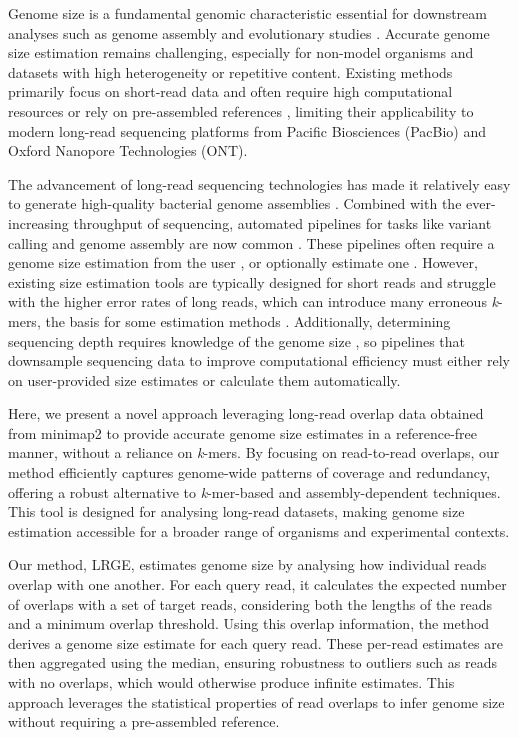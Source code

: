 \documentclass[unnumsec,webpdf,modern,large]{oup-authoring-template}
\theoremstyle{thmstyleone}%
\theoremstyle{thmstyletwo}%
\theoremstyle{thmstylethree}%
\newcommand{\lrge}{LRGE}
\newcommand{\kmer}{\textit{k}-mer}
\begin{document}
Genome size is a fundamental genomic characteristic essential for downstream analyses such as genome assembly \citep{wick_benchmarking_2020} and evolutionary studies \citep{pellicer_plant_2020}. Accurate genome size estimation remains challenging, especially for non-model organisms and datasets with high heterogeneity or repetitive content. Existing methods primarily focus on short-read data and often require high computational resources or rely on pre-assembled references \citep{vurture_genomescope_2017,ranallo-benavidez_genomescope_2020}, limiting their applicability to modern long-read sequencing platforms from Pacific Biosciences (PacBio) and Oxford Nanopore Technologies (ONT).

The advancement of long-read sequencing technologies has made it relatively easy to generate high-quality bacterial genome assemblies \citep{wick_assembling_2023}. Combined with the ever-increasing throughput of sequencing, automated pipelines for tasks like variant calling and genome assembly are now common \citep{murigneux_micropipe_2021,petit_bactopia_2020,bouras_hybracter_2024}. These pipelines often require a genome size estimation from the user \citep{murigneux_micropipe_2021}, or optionally estimate one \citep{petit_bactopia_2020,bouras_hybracter_2024}. However, existing size estimation tools are typically designed for short reads \citep{ranallo-benavidez_genomescope_2020,vurture_genomescope_2017} and struggle with the higher error rates of long reads, which can introduce many erroneous \kmer{}s, the basis for some estimation methods \citep{ondov_mash_2016,ranallo-benavidez_genomescope_2020}. Additionally, determining sequencing depth requires knowledge of the genome size \citep{hall_rasusa_2022}, so pipelines that downsample sequencing data to improve computational efficiency must either rely on user-provided size estimates or calculate them automatically.

Here, we present a novel approach leveraging long-read overlap data obtained from minimap2 \citep{li_minimap2_2018} to provide accurate genome size estimates in a reference-free manner, without a reliance on \kmer{}s. By focusing on read-to-read overlaps, our method efficiently captures genome-wide patterns of coverage and redundancy, offering a robust alternative to \kmer{}-based and assembly-dependent techniques. This tool is designed for analysing long-read datasets, making genome size estimation accessible for a broader range of organisms and experimental contexts.

Our method, \lrge{}, estimates genome size by analysing how individual reads overlap with one another. For each query read, it calculates the expected number of overlaps with a set of target reads, considering both the lengths of the reads and a minimum overlap threshold. Using this overlap information, the method derives a genome size estimate for each query read. These per-read estimates are then aggregated using the median, ensuring robustness to outliers such as reads with no overlaps, which would otherwise produce infinite estimates. This approach leverages the statistical properties of read overlaps to infer genome size without requiring a pre-assembled reference.
\end{document}

